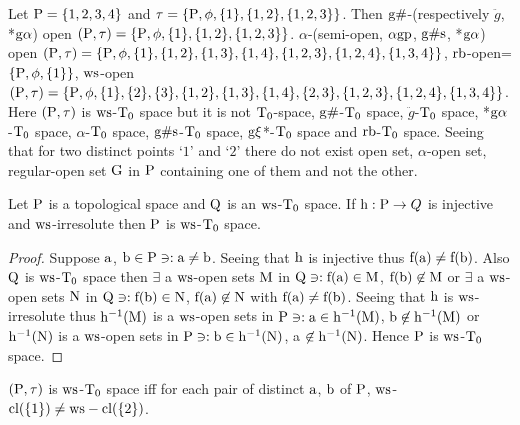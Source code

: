 \begin{exm}\label{exam8.2.4}
Let $\mathrm{P}= \{1,2,3,4\}$ and $\tau =\{\mathrm{P}, \phi, \{1\}, \{1,2\},\{1, 2 ,3\}\}$. Then $\mathrm{g}\#$-(respectively $\ddot{g}$, *$\mathrm{g}\alpha$) open $(\mathrm{P}, \tau)=\{\mathrm{P}, \phi, \{1\}, \{1,2\},\{1, 2,3\}\}$. $\alpha$-(semi-open, $\alpha\mathrm{g}\mathrm{p}$, $\mathrm{g}\#\mathrm{s}$, *$\mathrm{g}\alpha$) open $(\mathrm{P}, \tau) =\{\mathrm{P},\phi, \{1\}, \{1,2\},\{1,3\},\{1,4\},\{1,2,3\},\{1,2,4\},\{1,3,4\}\}$, $\mathrm{rb}$-open=$\{\mathrm{P}, \phi, \{1\}\}$, $\mathrm{ws}$-open $(\TSP, \tau)=\{\TSP,\phi, \{1\},\{2\},\{3\},\{1,2\},\{1,3\},\{1,4\},\break \{2,3\},\{1, 2, 3\},\{1,2, 4\},\{1, 3, 4\}\}$. Here $(\mathrm{P}, \tau)$ is $\mathrm{ws}$-$\mathrm{T}_{0}$ space but it is not $\mathrm{T}_{0}$-space, $\mathrm{g}\#$-$\mathrm{T}_{0}$ space, $\ddot{g}$-$\mathrm{T}_{0}$ space, *$\mathrm{g}\alpha$-$\mathrm{T}_{0}$ space, $\alpha$-$\mathrm{T}_{0}$ space, $\mathrm{g}\#\mathrm{s}$-$\mathrm{T}_{0}$ space, $\mathrm{g}\xi$*-$\mathrm{T}_{0}$ space and $\mathrm{rb}$-$\mathrm{T}_{0}$ space. Seeing that for two distinct points `$1$' and `$2$' there do not exist open set, $\alpha$-open set, regular-open set $\mathrm{G}$ in $\mathrm{P}$ containing one of them and not the other.
\end{exm}

\begin{thm}\label{thm8.2.5}
Let $\mathrm{P}$ is a topological space and $\mathrm{Q}$ is an $\mathrm{ws}$-$\mathrm{T}_{0}$ space. If $\mathrm{h}: \mathrm{P} \to Q$ is injective and $\mathrm{ws}$-irresolute then $\mathrm{P}$ is $\mathrm{ws}$-$\mathrm{T}_{0}$ space.
\end{thm}

\begin{proof}
Suppose $\mathrm{a}$, $\mathrm{b} \in \mathrm{P} \ni:\mathrm{a} \neq \mathrm{b}$. Seeing that $\mathrm{h}$ is injective thus $\mathrm{f}(\mathrm{a}) \neq \mathrm{f}(\mathrm{b})$. Also $\mathrm{Q}$ is $\mathrm{ws}$-$\mathrm{T}_{0}$ space then $\exists$ a $\mathrm{ws}$-open sets $\mathrm{M}$ in $\mathrm{Q} \ni: \mathrm{f}(\mathrm{a}) \in \mathrm{M}$, $\mathrm{f}(\mathrm{b}) \not\in \mathrm{M}$ or $\exists$  a $\mathrm{ws}$-open sets $\mathrm{N}$ in $\mathrm{Q} \ni :\mathrm{f}(\mathrm{b}) \in \mathrm{N}$, $\mathrm{f}(\mathrm{a}) \not\in \mathrm{N}$ with $\mathrm{f}(\mathrm{a}) \neq \mathrm{f}(\mathrm{b})$. Seeing that $\mathrm{h}$ is $\mathrm{ws}$-irresolute thus $\mathrm{h}^{-1} (\mathrm{M})$ is a $\mathrm{ws}$-open sets in $\mathrm{P} \ni: \mathrm{a} \in \mathrm{h}^{-1} (\mathrm{M})$, $\mathrm{b} \not\in \mathrm{h}^{-1} (\mathrm{M})$ or $\mathrm{h}^{-1} (\mathrm{N})$ is a $\mathrm{ws}$-open sets in $\mathrm{P} \ni:\mathrm{b} \in \mathrm{h}^{-1} (\mathrm{N})$, a $\not\in \mathrm{h}^{-1} (\mathrm{N})$. Hence $\mathrm{P}$ is $\mathrm{ws}$-$\mathrm{T}_{0}$ space.
\end{proof}

\begin{thm}\label{thm8.2.6}
$(\mathrm{P}, \tau)$ is $\mathrm{ws}$-$\mathrm{T}_{0}$ space iff for each pair of distinct $\mathrm{a}$, $\mathrm{b}$ of $\mathrm{P}$, $\mathrm{ws}$-$\mathrm{cl}(\{1\}) \neq \mathrm{ws}-\mathrm{cl}(\{2\})$.
\end{thm}

